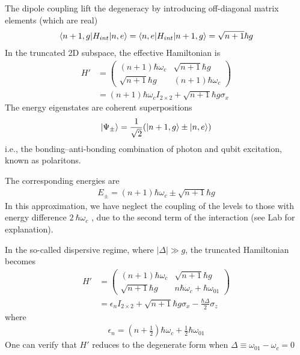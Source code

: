 The dipole coupling lift the degeneracy by introducing off-diagonal matrix elements (which are real)
\begin{align*}
    \braket{n+1, g|H_{int}|n,e}=\braket{n,e|H_{int}|n+1, g}=\sqrt{n+1}\hbar g
\end{align*}
In the truncated 2D subspace, the effective Hamiltonian is
\begin{align*}
    H'&=\begin{pmatrix}
        (n+1)\hbar\omega_c & \sqrt{n+1}\hbar g\\
        \sqrt{n+1}\hbar g & (n+1)\hbar\omega_c
    \end{pmatrix}\\
    &=(n+1)\hbar \omega_c I_{2\times 2}+\sqrt{n+1}\hbar g\sigma_x
\end{align*}
The energy eigenstates are coherent superpositions
\begin{align*}
    \ket{\Psi_\pm}=\frac{1}{\sqrt{2}}(\ket{n+1, g}\pm\ket{n,e})
\end{align*}
i.e., the bonding–anti-bonding combination of photon and qubit excitation, known as polaritons.

The corresponding energies are
\begin{align*}
    E_\pm =(n+1)\hbar\omega_c\pm\sqrt{n+1}\hbar g
\end{align*}
In this approximation, we have neglect the coupling of the levels to those with energy difference $2~\hbar\omega_c$ , due to the second term of the interaction (see Lab for explanation).

In the so-called dispersive regime, where $|\Delta|\gg g$, the truncated Hamiltonian becomes
\begin{align*}
    H'&=\begin{pmatrix}
        (n+1)\hbar\omega_c & \sqrt{n+1}\hbar g\\
        \sqrt{n+1}\hbar g & n\hbar\omega_c +\hbar\omega_{01}
    \end{pmatrix}\\
    &=\epsilon_n I_{2\times 2}+\sqrt{n+1}\hbar g \sigma_x - \frac{\hbar \Delta}{2}\sigma_z
\end{align*}
where 
\begin{align*}
    \epsilon_n=\left( n+\frac{1}{2} \right)\hbar\omega_c+\frac{1}{2}\hbar\omega_{01}
\end{align*}
One can verify that $H'$ reduces to the degenerate form when $\Delta\equiv \omega_{01}-\omega_c=0$

